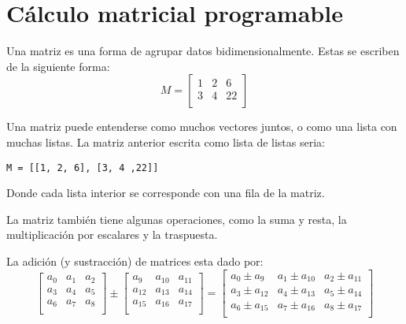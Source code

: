\section{Cálculo matricial programable}

Una matriz es una forma de agrupar datos bidimensionalmente. Estas se escriben de la siguiente forma:
\begin{equation*}
    M=\left[
        \begin{array}{ccc}
            1 & 2 & 6 \\
            3 & 4 & 22 \\
        \end{array}
    \right]
\end{equation*}

Una matriz puede entenderse como muchos vectores juntos, o como una lista con muchas listas. La matriz anterior escrita como lista de listas seria:
\begin{lstlisting}[style=consola]
M = [[1, 2, 6], [3, 4 ,22]]
\end{lstlisting}
Donde cada lista interior se corresponde con una fila de la matriz.

La matriz también tiene algunas operaciones, como la suma y resta, la multiplicación por escalares y la traspuesta.

La adición (y sustracción) de matrices esta dado por:
\begin{equation*}
    \left[
        \begin{array}{ccc}
            a_0 & a_1 & a_2 \\
            a_3 & a_4 & a_5 \\
            a_6 & a_7 & a_8 \\
        \end{array}
    \right]
    \pm
    \left[
        \begin{array}{ccc}
            a_9 & a_{10} & a_{11} \\
            a_{12} & a_{13} & a_{14} \\
            a_{15} & a_{16} & a_{17} \\
        \end{array}
    \right]
    =
    \left[
        \begin{array}{ccc}
            a_0 \pm a_9 & a_1 \pm a_{10} & a_2 \pm a_{11} \\
            a_3 \pm a_{12} & a_4 \pm a_{13} & a_5 \pm a_{14} \\
            a_6 \pm a_{15} & a_7 \pm a_{16} & a_8 \pm a_{17} \\
        \end{array}
    \right]
\end{equation*}

